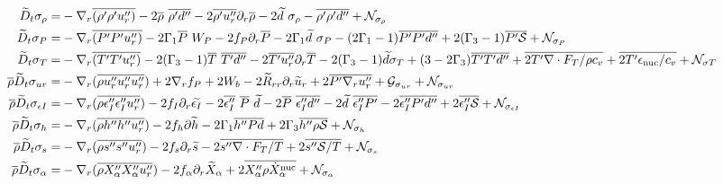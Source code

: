 \documentclass[10pt,paper=a4]{report}
\newcommand{\eht}{\overline}
\newcommand{\fht}{\widetilde}
\begin{document}
\begin{table}[!h]
\label{tab:rans-variances}
\begin{align}
\fht{D}_t \sigma_\rho =  &  - \nabla_r \eht{(\rho' \rho ' u''_r)}  - 2\eht{\rho} \ \eht{\rho'd''} - 2 \eht{\rho'u''_r} \partial_r \eht{\rho} - 2 \fht{d} \ \sigma_\rho - \eht{\rho'\rho'd''} + {\mathcal N_{\sigma_\rho}} \\
\fht{D}_t \sigma_P = & - \nabla_r \eht{(P' P' u''_r)} - 2\Gamma_1 \eht{P} \ W_P - 2 f_P \partial_r \eht{P} - 2\Gamma_1 \widetilde{d} \ \sigma_P - (2 \Gamma_1 -1) \eht{P'P'd''} + 2(\Gamma_3 - 1)\eht{P' {\mathcal S}} + {\mathcal N_{\sigma_P}} \\
\fht{D}_t \sigma_T = & -\nabla_r \eht{(T' T' u''_r)} - 2(\Gamma_3 -1)\eht{T} \ \eht{T'd''} - 2\eht{T'u''_r} \partial_r \eht{T} - 2(\Gamma_3-1)\fht{d}\sigma_T + (3-2\Gamma_3)\eht{T'T'd''} + \eht{2 T' \nabla \cdot F_T/ \rho c_v} + \eht{2 T' \epsilon_{\rm nuc} / c_v} + {\mathcal N_{\sigma T}}  \\
\eht{\rho} \fht{D}_t \sigma_{ur} = & -\nabla_r ( \eht{\rho u''_r u''_r u''_r} ) + 2 \nabla_r f_P + 2 W_b - 2\fht{R}_{rr}\partial_r \fht{u}_r + 2 \overline{P'\nabla_r u''_r} + {\mathcal G_{\sigma_{ur}}} + {\mathcal N_{\sigma_{ur}}} \\
\eht{\rho} \fht{D}_t \sigma_{\epsilon I} = &  -\nabla_r (\eht{\rho \epsilon''_I \epsilon''_I u''_r} ) - 2 f_I \partial_r \fht{\epsilon_I} - 2\overline{\epsilon''_I}\ \eht{P} \ \fht{d} - 2\eht{P} \ \eht{\epsilon''_I d''} - 2\fht{d} \ \eht{\epsilon''_I P'} - 2\overline{\epsilon''_I P' d''} + 2\eht{\epsilon''_I {\mathcal S}} + {\mathcal N_{\sigma_{\epsilon I}}} \\
\eht{\rho} \fht{D}_t \sigma_{h} = & -\nabla_r (\eht{\rho h'' h'' u''_r} )  - 2 f_h \partial \widetilde{h} - 2\Gamma_1 \overline{h''Pd} + 2\Gamma_3 \overline{h'' \rho \mathcal{S}} + {\mathcal N_{\sigma_{h}}} \\
\eht{\rho} \fht{D}_t \sigma_s = & -\nabla_r ( \eht{\rho s'' s'' u''_r} ) - 2 f_s \partial_r \fht{s} - 2\eht{s'' \nabla \cdot F_T / T} + 2 \eht{s'' {\mathcal S} / T} + {\mathcal N_{\sigma_{s}}}\\
\eht{\rho} \fht{D}_t \sigma_\alpha = & -\nabla_r (\eht{\rho X''_\alpha X''_\alpha u''_r} ) - 2 f_\alpha \partial_r \fht{X}_\alpha + 2 \eht{X''_\alpha \rho \dot{X}_\alpha^{\rm nuc}} + {\mathcal N_{\sigma_\alpha}}
\end{align}
\end{table}
\end{document}
